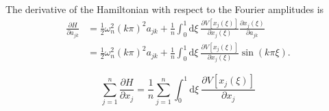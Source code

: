 \documentclass[11 pt]{article}
\begin{document}
  The derivative of the Hamiltonian with respect to the Fourier amplitudes is
\begin{align}
  \frac{ \partial H}{ \partial a_{jk}}  
    &= \frac{1}{2} \omega_{n}^{2}(k\pi)^2 a_{jk} + \frac{1}{n}\int_{0}^{1} \mathrm{d} \xi\
  \frac{ \partial V[x_{j}(\xi)]}{ \partial x_{j}(\xi)} \frac{ \partial x_{j}(\xi)}{ \partial a_{jk}}\\
    &= \frac{1}{2} \omega_{n}^{2}(k\pi)^2 a_{jk}+ \frac{1}{n}\int_{0}^{1} \mathrm{d} \xi\
  \frac{ \partial V[x_{j}(\xi)]}{ \partial x_{j}(\xi)} \sin(k\pi\xi).
  \label{eq:part-a}
\end{align}

\begin{equation}
  \sum^{n}_{j=1} \frac{ \partial H}{ \partial x_{j}} = \frac{1}{n} \sum^{n}_{j=1} \int_{0}^{1} \mathrm{d} \xi\
  \frac{ \partial V[x_{j}(\xi)]}{ \partial x_{j}}
  \label{eq:sum-part-x}
\end{equation}

  
\end{document}
